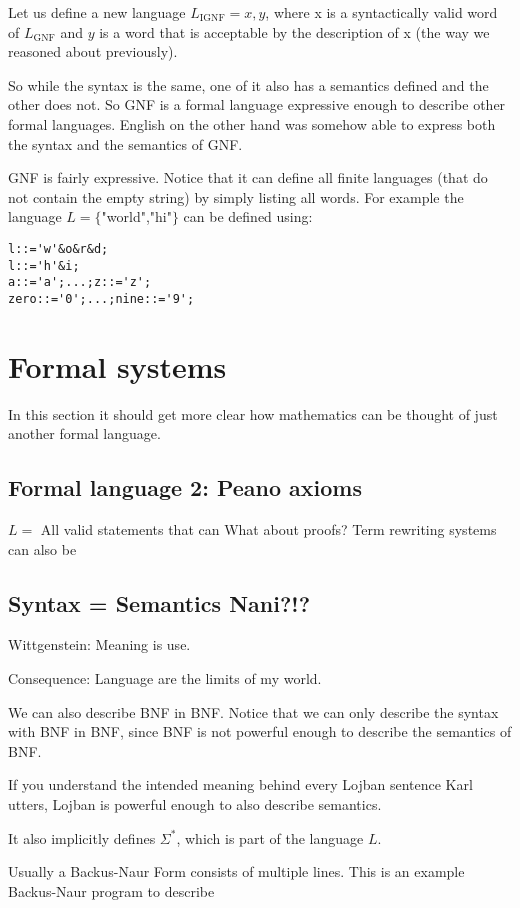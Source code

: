 Let us define a new language $L_{\text{IGNF}} = x,y$, where x is a syntactically valid word of $L_{\text{GNF}}$ and $y$ is a word that is acceptable by the description of x (the way we reasoned about previously).


 So while the syntax is the same, one of it also has a semantics defined and the other does not. So GNF is a formal language expressive enough to describe other formal languages.
English on the other hand was somehow able to express both the syntax and the semantics of GNF.

GNF is fairly expressive. Notice  that it can define all finite languages (that do not contain the empty string) by simply listing all words. For example the language $L = \{$"world","hi"$\}$ can be defined using:
\begin{lstlisting}
l::='w'&o&r&d;
l::='h'&i;
a::='a';...;z::='z';  
zero::='0';...;nine::='9';  
\end{lstlisting}

\section{Formal systems}
In this section it should get more clear how mathematics can be thought of just another formal language.

\subsection{Formal language 2: Peano axioms}

$L =$ All valid statements that can 
What about proofs?
Term rewriting systems can also be 

\subsection{Syntax = Semantics Nani?!?}
Wittgenstein: Meaning is use.

Consequence: Language are the limits of my world.


We can also describe BNF in BNF. Notice that we can only describe the syntax with BNF in BNF, since BNF is not powerful enough to describe the semantics of BNF.

If you understand the intended meaning behind every Lojban sentence Karl utters, Lojban is powerful enough to also describe semantics.
 

It also implicitly defines $\Sigma^*$, which is part of the language $L$.

Usually a Backus-Naur Form consists of multiple lines. This is an example Backus-Naur program to describe 


